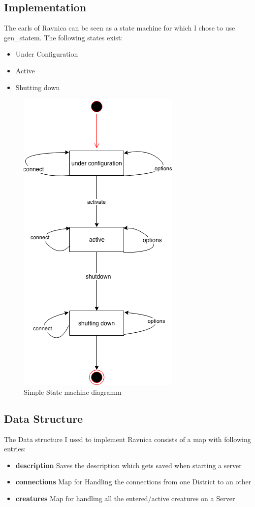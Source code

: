 \documentclass[12pt,a4paper]{article}
\begin{document}
\subsection{Implementation}
The earls of Ravnica can be seen as a state machine for which I chose to use gen\_statem.
The following states exist:
\begin{itemize}
	\item Under Configuration
	\item Active
	\item Shutting down
\end{itemize}

\begin{figure}[!htb]
	\includegraphics{images/ravnica}
	\caption{Simple State machine diagramm}
\end{figure}

\subsection{Data Structure}
The Data structure I used to implement Ravnica consists of a map with following entries:
\begin{itemize}
	\item \textbf{description} Saves the description which gets saved when starting a server
	\item \textbf{connections} Map for Handling the connections from one District to an other
	\item \textbf{creatures} Map for handling all the entered/active creatures on a Server
\end{itemize}
\end{document}
